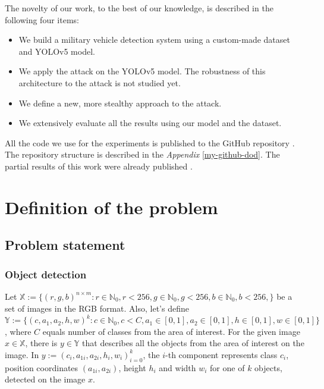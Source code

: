 \documentclass[14pt,a4paper]{extarticle}
\newcounter{e}
\newcounter{dod}
\numberwithin{equation}{section}
\numberwithin{figure}{section}
\begin{document}
The novelty of our work, to the best of our knowledge, is described in the following four items:
\begin{itemize}
    \item We build a military vehicle detection system using a custom-made dataset and YOLOv5 model.
    \item We apply the attack \cite{white-rectangle} on the YOLOv5 model. The robustness of this architecture to the attack is not studied yet.
    \item We define a new, more stealthy approach to the attack.
    \item We extensively evaluate all the results using our model and the dataset.
    
\end{itemize}

All the code we use for the experiments is published to the GitHub repository \cite{my-github}. The repository structure is described in the \textit{Appendix} \ref{my-github-dod}. The partial results of this work were already published \cite{buhrii-publication}.

\newpage
\thispagestyle{empty}


\section{Definition of the problem}

\subsection{Problem statement}
\subsubsection{Object detection}
Let $\mathbb{X} := \{(r, g, b)^{n \times m} : r \in \mathbb{N}_0, r < 256,  g \in \mathbb{N}_0, g < 256, b \in \mathbb{N}_0, b < 256, \}$ be a set of images in the RGB format. Also, let's define $\mathbb{Y}:=\{(c, a_{1}, a_{2}, h, w)^k : c \in \mathbb{N}_0, c<C, a_1 \in [0, 1], a_2 \in [0, 1], h \in [0, 1], w \in [0, 1]\}$, where $C$ equals number of classes from the area of interest. For the given image $x \in \mathbb{X}$, there is $y \in \mathbb{Y}$ that describes all the objects from the area of interest on the image. In $y:=(c_i, a_{1i}, a_{2i}, h_i, w_i)^k_{i=0}$, the $i$-th component represents class $c_i$, position coordinates $(a_{1i}, a_{2i})$, height $h_i$ and width $w_i$ for one of $k$ objects, detected on the image $x$.
\end{document}
